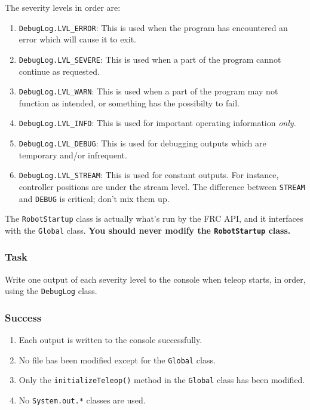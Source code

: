 \documentclass[a4paper]{article}
\begin{document}
The severity levels in order are:

\begin{enumerate}\item{\lstinline{DebugLog.LVL_ERROR}: This is used when the program has encountered an error which will cause it to exit.}\item{\lstinline{DebugLog.LVL_SEVERE}: This is used when a part of the program cannot continue as requested.}\item{\lstinline{DebugLog.LVL_WARN}: This is used when a part of the program may not function as intended, or something has the possibilty to fail.}\item{\lstinline{DebugLog.LVL_INFO}: This is used for important operating information \textit{only}.}\item{\lstinline{DebugLog.LVL_DEBUG}: This is used for debugging outputs which are temporary and/or infrequent.}\item{\lstinline{DebugLog.LVL_STREAM}: This is used for constant outputs. For instance, controller positions are under the stream level. The difference between \lstinline{STREAM} and \lstinline{DEBUG} is critical; don't mix them up.}\end{enumerate}

The \lstinline{RobotStartup} class is actually what's run by the FRC API, and it interfaces with the \lstinline{Global} class. \textbf{You should never modify the \lstinline{RobotStartup} class.}

\subsubsection{Task} Write one output of each severity level to the console when teleop starts, in order, using the \lstinline{DebugLog} class.
\subsubsection{Success} \begin{enumerate}\item{Each output is written to the console successfully.}\item{No file has been modified except for the \lstinline{Global} class.}\item{Only the \lstinline{initializeTeleop()} method in the \lstinline{Global} class has been modified.}\item{No \lstinline{System.out.*} classes are used.}\end{enumerate}
\end{document}
